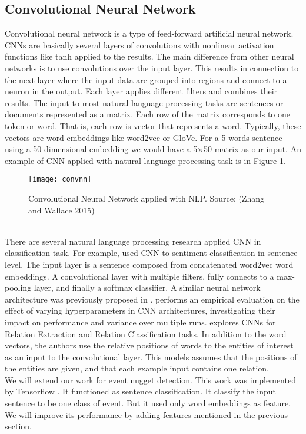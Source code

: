 \subsection{Convolutional Neural Network}
Convolutional neural network is a type of feed-forward artificial neural network. CNNs are basically several layers of convolutions with nonlinear activation functions like tanh applied to the results. The main difference from other neural networks is to use convolutions over the input layer. This results in connection to the next layer where the input data are grouped into regions and  connect to a neuron in the output. Each layer applies different filters and combines their results. 
The input to most natural language processing tasks are sentences or documents represented as a matrix. Each row of the matrix corresponds to one token or word. That is, each row is vector that represents a word. Typically, these vectors are word embeddings like word2vec or GloVe. For a 5 words sentence using a 50-dimensional embedding we would have a 5×50 matrix as our input. An example of CNN applied with natural language processing task is in Figure \ref{fig:convnn}.
\begin{figure}
    \centering
    \texttt{[image: convnn]}
    \caption{Convolutional Neural Network applied with NLP. Source: (Zhang and Wallace 2015)}
    \label{fig:convnn}    
\end{figure}\\
\indent There are several natural language processing research applied CNN in classification task. For example, \cite{kim2014convolutional} used CNN to sentiment classification in sentence level. The input layer is a sentence composed from concatenated word2vec word embeddings. A convolutional layer with multiple filters, fully connects to a max-pooling layer, and finally a softmax classifier. A similar neural network architecture was previously proposed in \cite{kalchbrenner2014convolutional}. \cite{zhang2015sensitivity} performs an empirical evaluation on the effect of varying hyperparameters in CNN architectures, investigating their impact on performance and variance over multiple runs. \cite{nguyen2015relation} explores CNNs for  Relation Extraction and Relation Classification tasks. In addition to the word vectors, the authors use the relative positions of words to the entities of interest as an input to the convolutional layer. This models assumes that the positions of the entities are given, and that each example input contains one relation.\\
\indent We will extend our work \cite{satyapanich2016event} for event nugget detection. This work was implemented by Tensorflow \cite{tensorflow2015-whitepaper}. It functioned as sentence classification. It classify the input sentence to be one class of event. But it used only word embeddings as feature. We will improve its performance by adding features mentioned in the previous section.

